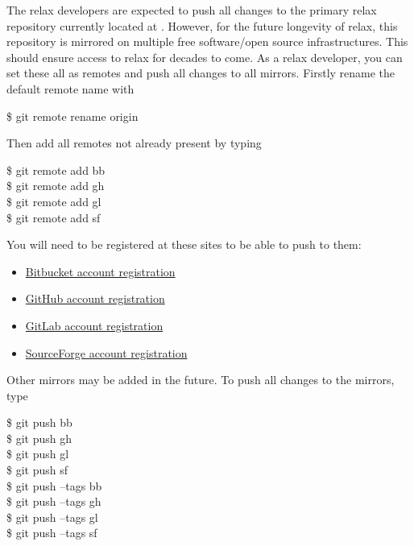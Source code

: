 The relax developers are expected to push all changes to the primary relax repository currently located at \relaxHome.
However, for the future longevity of relax, this repository is mirrored on multiple free software/open source infrastructures.
This should ensure access to relax for decades to come.
As a relax developer, you can set these all as remotes and push all changes to all mirrors.
Firstly rename the default remote name  with

\begin{exampleenv}
\$ git remote rename origin \relaxHomeRemoteName
\end{exampleenv}

Then add all remotes not already present by typing

\begin{exampleenv}
\$ git remote add bb \relaxMirrorBBCodeURLDeveloper \\
\$ git remote add gh \relaxMirrorGHCodeURLDeveloper \\
\$ git remote add gl \relaxMirrorGLCodeURLDeveloper \\
\$ git remote add sf \relaxMirrorSFCodeURLDeveloper
\end{exampleenv}

You will need to be registered at these sites to be able to push to them:
\begin{itemize}
    \item \href{\relaxMirrorBBRegisterURL}{Bitbucket account registration}
    \item \href{\relaxMirrorGHRegisterURL}{GitHub account registration}
    \item \href{\relaxMirrorGLRegisterURL}{GitLab account registration}
    \item \href{\relaxMirrorSFRegisterURL}{SourceForge account registration}
\end{itemize}

Other mirrors may be added in the future.
To push all changes to the mirrors, type

\begin{exampleenv}
\$ git push bb \\
\$ git push gh \\
\$ git push gl \\
\$ git push sf \\
\$ git push --tags bb \\
\$ git push --tags gh \\
\$ git push --tags gl \\
\$ git push --tags sf
\end{exampleenv}


